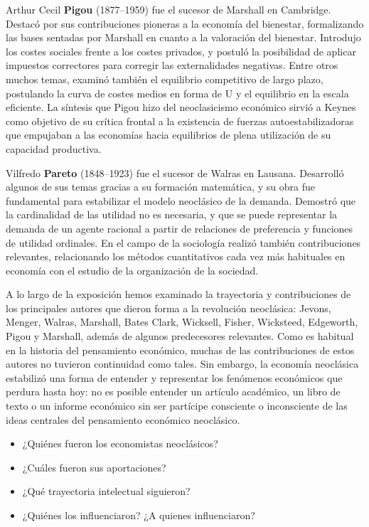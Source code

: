 \documentclass{nuevotema}
\begin{document}
Arthur Cecil \textbf{Pigou} (1877--1959) fue el sucesor de Marshall en Cambridge. Destacó por sus contribuciones pioneras a la economía del bienestar, formalizando las bases sentadas por Marshall en cuanto a la valoración del bienestar. Introdujo los costes sociales frente a los costes privados, y postuló la posibilidad de aplicar impuestos correctores para corregir las externalidades negativas. Entre otros muchos temas, examinó también el equilibrio competitivo de largo plazo, postulando la curva de costes medios en forma de U y el equilibrio en la escala eficiente. La síntesis que Pigou hizo del neoclasicismo económico sirvió a Keynes como objetivo de su crítica frontal a la existencia de fuerzas autoestabilizadoras que empujaban a las economías hacia equilibrios de plena utilización de su capacidad productiva.

Vilfredo \textbf{Pareto} (1848--1923) fue el sucesor de Walras en Lausana. Desarrolló algunos de sus temas gracias a su formación matemática, y su obra fue fundamental para estabilizar el modelo neoclásico de la demanda. Demostró que la cardinalidad de las utilidad no es necesaria, y que se puede representar la demanda de un agente racional a partir de relaciones de preferencia y funciones de utilidad ordinales. En el campo de la sociología realizó también contribuciones relevantes, relacionando los métodos cuantitativos cada vez más habituales en economía con el estudio de la organización de la sociedad.

A lo largo de la exposición hemos examinado la trayectoria y contribuciones de los principales autores que dieron forma a la revolución neoclásica: Jevons, Menger, Walras, Marshall, Bates Clark, Wicksell, Fisher, Wicksteed, Edgeworth, Pigou y Marshall, además de algunos predecesores relevantes. Como es habitual en la historia del pensamiento económico, muchas de las contribuciones de estos autores no tuvieron continuidad como tales. Sin embargo, la economía neoclásica estabilizó una forma de entender y representar los fenómenos económicos que perdura hasta hoy: no es posible entender un artículo académico, un libro de texto o un informe económico sin ser partícipe consciente o inconsciente de las ideas centrales del pensamiento económico neoclásico. 


\begin{itemize}
	\item ¿Quiénes fueron los economistas neoclásicos?
	\item ¿Cuáles fueron sus aportaciones?
	\item ¿Qué trayectoria intelectual siguieron?
	\item ¿Quiénes los influenciaron? ¿A quienes influenciaron?
\end{itemize}
\end{document}
